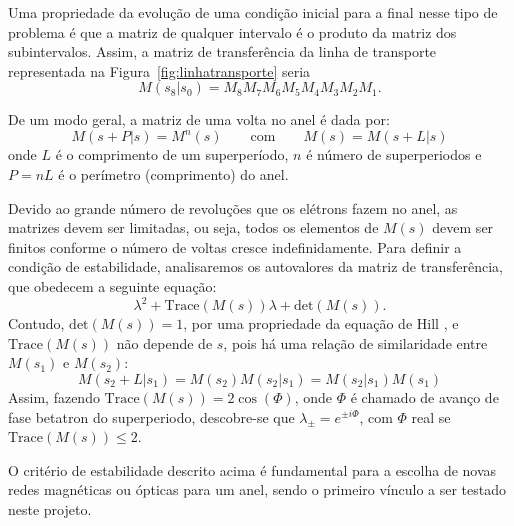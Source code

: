 
Uma propriedade da evolução de uma condição inicial para a final nesse tipo de problema é que a matriz de qualquer intervalo é o produto da matriz dos subintervalos. Assim, a matriz de transferência da linha de transporte representada na \mbox{Figura~\ref{fig:linhatransporte}} seria
\begin{equation}
M(s_8|s_0)=M_8M_7M_6M_5M_4M_3M_2M_1.
\end{equation}

De um modo geral, a matriz de uma volta no anel é dada por:
\begin{displaymath}
 M(s + P|s)=M^n(s)\qquad \mathrm{com} \qquad M(s)=M(s+L|s)
\end{displaymath}
onde $L$ é o comprimento de um superperíodo, $n$ é número de superperiodos e $P=n L$ é o perímetro (comprimento) do anel.

Devido ao grande número de revoluções que os elétrons fazem no anel, as matrizes devem ser limitadas, ou seja, todos os elementos de $M(s)$ devem ser finitos conforme o número de voltas cresce indefinidamente. Para definir a condição de estabilidade, analisaremos os autovalores da matriz de
transferência, que obedecem a seguinte equação:
\begin{equation}
 \lambda^2+\mathrm{Trace}\left(M(s)\right) \lambda +
\mathrm{det}\left(M(s)\right).
\end{equation}
Contudo, $\mathrm{det}\left(M(s)\right)=1$, por uma propriedade da equação de Hill \cite{Lee,Wiedemann3}, e $\mathrm{Trace}\left(M(s)\right)$ não depende de $s$, pois há uma relação de similaridade entre $M(s_1)$ e $M(s_2)$:
\begin{equation} \label{eqsimilaridade}
 M(s_2+L | s_1) = M(s_2) M(s_2 | s_1) = M(s_2 | s_1) M(s_1)
\end{equation}
Assim, fazendo $\mathrm{Trace}\left(M(s)\right)=2 \cos(\Phi)$, onde $\Phi$ é chamado de avanço de fase betatron do superperiodo, descobre-se que $\lambda_\pm = e^{\pm i \Phi}$, com $\Phi$ real se  $\mathrm{Trace}\left(M(s)\right)\leq 2$.

O critério de estabilidade descrito acima é fundamental para a escolha de novas redes magnéticas ou ópticas para um anel, sendo o primeiro vínculo a ser testado neste projeto.

